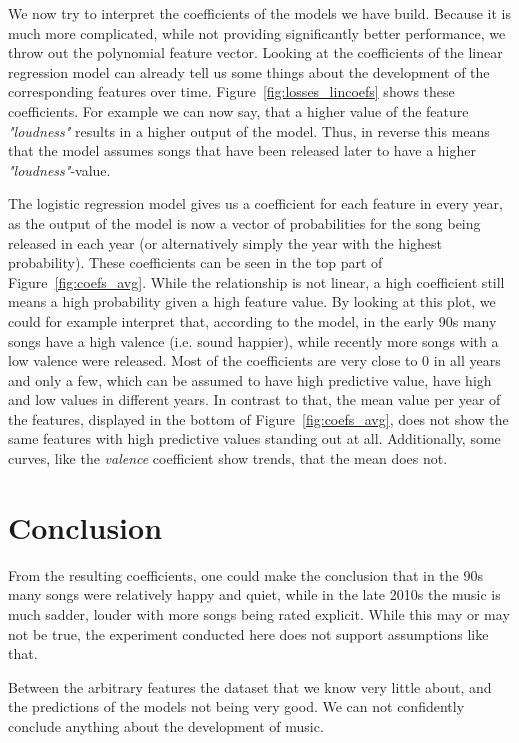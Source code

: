 \documentclass{article}
\begin{document}
We now try to interpret the coefficients of the models we have build. Because it is much more complicated, while not providing significantly better performance, we throw out the polynomial feature vector. Looking at the coefficients of the linear regression model can already tell us some things about the development of the corresponding features over time. Figure~\ref{fig:losses_lincoefs} shows these coefficients. For example we can now say, that a higher value of the feature \emph{"loudness"} results in a higher output of the model. Thus, in reverse this means that the model assumes songs that have been released later to have a higher \emph{"loudness"}-value.

The logistic regression model gives us a coefficient for each feature in every year, as the output of the model is now a vector of probabilities for the song being released in each year (or alternatively simply the year with the highest probability). These coefficients can be seen in the top part of Figure~\ref{fig:coefs_avg}. While the relationship is not linear, a high coefficient still means a high probability given a high feature value. By looking at this plot, we could for example interpret that, according to the model, in the early 90s many songs have a high valence (i.e. sound happier), while recently more songs with a low valence were released.
Most of the coefficients are very close to 0 in all years and only a few, which can be assumed to have high predictive value, have high and low values in different years. 
In contrast to that, the mean value per year of the features, displayed in the bottom of Figure~\ref{fig:coefs_avg}, does not show the same features with high predictive values standing out at all. Additionally, some curves, like the \emph{valence} coefficient show trends, that the mean does not.


\section{Conclusion}

From the resulting coefficients, one could make the conclusion that in the 90s many songs were relatively happy and quiet, while in the late 2010s the music is much sadder, louder with more songs being rated explicit. While this may or may not be true, the experiment conducted here does not support assumptions like that.

Between the arbitrary features the dataset that we know very little about, and the predictions of the models not being very good. We can not confidently conclude anything about the development of music.

 
\end{document}
